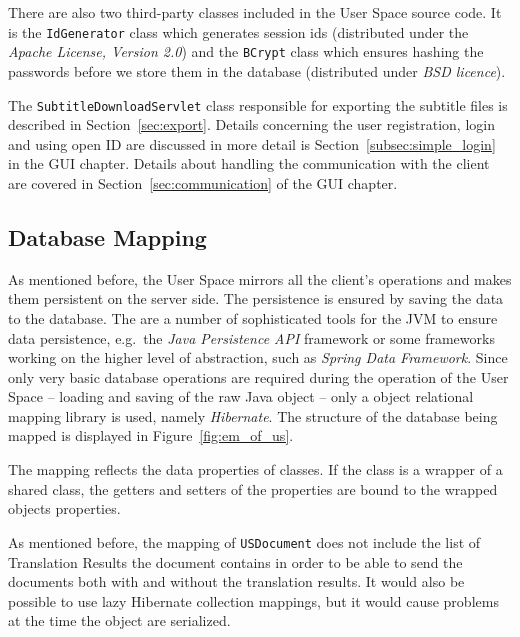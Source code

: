There are also two third-party classes included in the User Space source code. It is the {\tt IdGenerator} class which generates session ids (distributed under the {\it Apache License, Version 2.0}) and the {\tt BCrypt} class which ensures hashing the passwords before we store them in the database (distributed under {\it BSD licence}).

The {\tt SubtitleDownloadServlet} class responsible for exporting the subtitle files is described in Section~\ref{sec:export}. Details concerning the user registration, login and using open ID are discussed in more detail is Section~\ref{subsec:simple_login} in the GUI chapter. Details about handling the communication with the client are covered in Section~\ref{sec:communication} of the GUI chapter.

\subsection{Database Mapping}
\label{subsec:database_mapping}

As mentioned before, the User Space mirrors all the client's operations and makes them persistent on the server side. The persistence is ensured by saving the data to the database. The are a number of sophisticated tools for the JVM to ensure data persistence, e.g.\ the \emph{Java Persistence API} framework or some frameworks working on the higher level of abstraction, such as \emph{Spring Data Framework}. Since only very basic database operations are required during the operation of the User Space -- loading and saving of the raw Java object -- only a object relational mapping library is used, namely \emph{Hibernate}. The structure of the database being mapped is displayed in Figure~\ref{fig:em_of_us}.

The mapping reflects the data properties of classes. If the class is a wrapper of a shared class, the getters and setters of the properties are bound to the wrapped objects properties.

As mentioned before, the mapping of {\tt USDocument} does not include the list of Translation Results the document contains in order to be able to send the documents both with and without the translation results. It would also be possible to use lazy Hibernate collection mappings, but it would cause problems at the time the object are serialized.


